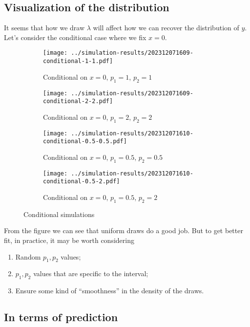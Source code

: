 \documentclass[12pt]{article}
\begin{document}
    \subsection{Visualization of the distribution}
    It seems that how we draw \(\lambda\) will affect how we can recover the distribution of \(y\). Let's consider the conditional case where we fix \(x = 0\).  

\begin{figure}[htbp]
    \centering
    \begin{subfigure}{.5\textwidth}
        \centering
        \texttt{[image: ../simulation-results/202312071609-conditional-1-1.pdf]}
        \caption{Conditional on \(x = 0\), \(p_{1} = 1\), \(p_{2} = 1\)}
        \label{fig:sub1}
    \end{subfigure}%
    \begin{subfigure}{.5\textwidth}
        \centering
        \texttt{[image: ../simulation-results/202312071609-conditional-2-2.pdf]}
        \caption{Conditional on \(x = 0\), \(p_{1} = 2\), \(p_{2} = 2\)}
        \label{fig:sub2}
    \end{subfigure}
    \begin{subfigure}{.5\textwidth}
        \centering
        \texttt{[image: ../simulation-results/202312071610-conditional-0.5-0.5.pdf]}
        \caption{Conditional on \(x = 0\), \(p_{1} = 0.5\), \(p_{2} = 0.5\)}
        \label{fig:sub3}
    \end{subfigure}%
    \begin{subfigure}{.5\textwidth}
        \centering
        \texttt{[image: ../simulation-results/202312071610-conditional-0.5-2.pdf]}
        \caption{Conditional on \(x = 0\), \(p_{1} = 0.5\), \(p_{2} = 2\)}
        \label{fig:sub4}
    \end{subfigure}
    \caption{Conditional simulations}
    \label{fig:test}
\end{figure}

From the figure we can see that uniform draws do a good job. But to get better fit, in practice, it may be worth considering
\begin{enumerate}
    \item Random \(p_{1}, p_{2}\) values;
    \item \(p_{1},p_{2}\) values that are specific to the interval;
    \item Ensure some kind of ``smoothness'' in the density of the draws.
\end{enumerate}

\newpage
\subsection{In terms of prediction} 
\end{document}
